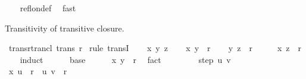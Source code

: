 \begin{isabellebody}
%
\isadelimproof
\ \ %
\endisadelimproof
%
\isatagproof
{}\isamarkupfalse%
\ refl{\isacharunderscore}{\kern0pt}on{\isacharunderscore}{\kern0pt}def\ \isamarkupfalse%
\ fast%
\endisatagproof
{\isafoldproof}%
%
\isadelimproof
%
\endisadelimproof
%
\begin{isamarkuptext}%
Transitivity of transitive closure.%
\end{isamarkuptext}\isamarkuptrue%
\isamarkupfalse%
\ trans{\isacharunderscore}{\kern0pt}rtrancl{\isacharcolon}{\kern0pt}\ {\isachardoublequoteopen}trans\ {\isacharparenleft}{\kern0pt}r\isactrlsup {\isacharasterisk}{\kern0pt}{\isacharparenright}{\kern0pt}{\isachardoublequoteclose}\isanewline
%
\isadelimproof
%
\endisadelimproof
%
\isatagproof
{}\isamarkupfalse%
\ {\isacharparenleft}{\kern0pt}rule\ transI{\isacharparenright}{\kern0pt}\isanewline
\ \ \isamarkupfalse%
\ x\ y\ z\isanewline
\ \ \isamarkupfalse%
\ {\isachardoublequoteopen}{\isacharparenleft}{\kern0pt}x{\isacharcomma}{\kern0pt}\ y{\isacharparenright}{\kern0pt}\ {\isasymin}\ r\isactrlsup {\isacharasterisk}{\kern0pt}{\isachardoublequoteclose}\isanewline
\ \ \isamarkupfalse%
\ {\isachardoublequoteopen}{\isacharparenleft}{\kern0pt}y{\isacharcomma}{\kern0pt}\ z{\isacharparenright}{\kern0pt}\ {\isasymin}\ r\isactrlsup {\isacharasterisk}{\kern0pt}{\isachardoublequoteclose}\isanewline
\ \ \isamarkupfalse%
\ \isamarkupfalse%
\ {\isachardoublequoteopen}{\isacharparenleft}{\kern0pt}x{\isacharcomma}{\kern0pt}\ z{\isacharparenright}{\kern0pt}\ {\isasymin}\ r\isactrlsup {\isacharasterisk}{\kern0pt}{\isachardoublequoteclose}\isanewline
\ \ \isamarkupfalse%
\ induct\isanewline
\ \ \ \ \isamarkupfalse%
\ base\isanewline
\ \ \ \ \isamarkupfalse%
\ {\isachardoublequoteopen}{\isacharparenleft}{\kern0pt}x{\isacharcomma}{\kern0pt}\ y{\isacharparenright}{\kern0pt}\ {\isasymin}\ r\isactrlsup {\isacharasterisk}{\kern0pt}{\isachardoublequoteclose}\ \isamarkupfalse%
\ fact\isanewline
\ \ \isamarkupfalse%
\isanewline
\ \ \ \ \isamarkupfalse%
\ {\isacharparenleft}{\kern0pt}step\ u\ v{\isacharparenright}{\kern0pt}\isanewline
\ \ \ \ \isamarkupfalse%
\ {\isacartoucheopen}{\isacharparenleft}{\kern0pt}x{\isacharcomma}{\kern0pt}\ u{\isacharparenright}{\kern0pt}\ {\isasymin}\ r\isactrlsup {\isacharasterisk}{\kern0pt}{\isacartoucheclose}\ \ {\isacartoucheopen}{\isacharparenleft}{\kern0pt}u{\isacharcomma}{\kern0pt}\ v{\isacharparenright}{\kern0pt}\ {\isasymin}\ r{\isacartoucheclose}\isanewline

\end{isabellebody}
